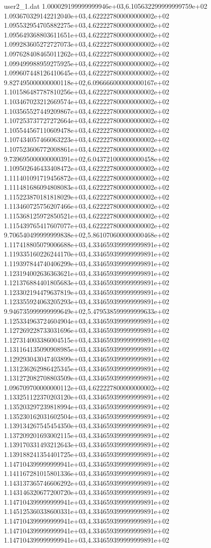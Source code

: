 \begin{filecontents}{user2_1.dat}
1.000029199999999946e+03,6.105632299999999759e+02
1.093670329142212040e+03,4.622227800000000002e+02
1.095532954705882275e+03,4.622227800000000002e+02
1.095649368803611651e+03,4.622227800000000002e+02
1.099283605272727073e+03,4.622227800000000002e+02
1.097628408465011262e+03,4.622227800000000002e+02
1.099499988959275925e+03,4.622227800000000002e+02
1.099607448126410645e+03,4.622227800000000002e+02
9.827495000000000118e+02,6.096666000000000167e+02
1.101586487787810256e+03,4.622227800000000002e+02
1.103467023212669574e+03,4.622227800000000002e+02
1.103565527449209867e+03,4.622227800000000002e+02
1.107253737727272664e+03,4.622227800000000002e+02
1.105544567110609478e+03,4.622227800000000002e+02
1.107434057466063223e+03,4.622227800000000002e+02
1.107523606772008861e+03,4.622227800000000002e+02
9.739695000000000391e+02,6.043721000000000458e+02
1.109502646433408472e+03,4.622227800000000002e+02
1.111401091719456872e+03,4.622227800000000002e+02
1.111481686094808083e+03,4.622227800000000002e+02
1.115223870181818029e+03,4.622227800000000002e+02
1.113460725756207466e+03,4.622227800000000002e+02
1.115368125972850521e+03,4.622227800000000002e+02
1.115439765417607077e+03,4.622227800000000002e+02
9.706540499999999838e+02,5.861070600000000468e+02
1.117418805079006688e+03,4.334659399999999891e+02
1.119335160226244170e+03,4.334659399999999891e+02
1.119397844740406299e+03,4.334659399999999891e+02
1.123194002636363621e+03,4.334659399999999891e+02
1.121376884401805683e+03,4.334659399999999891e+02
1.123302194479637819e+03,4.334659399999999891e+02
1.123355924063205293e+03,4.334659399999999891e+02
9.946735999999999649e+02,5.479538599999999633e+02
1.125334963724604904e+03,4.334659399999999891e+02
1.127269228733031696e+03,4.334659399999999891e+02
1.127314003386004515e+03,4.334659399999999891e+02
1.131164135090908985e+03,4.334659399999999891e+02
1.129293043047403899e+03,4.334659399999999891e+02
1.131236262986425345e+03,4.334659399999999891e+02
1.131272082708803509e+03,4.334659399999999891e+02
1.096709700000000112e+03,4.622227800000000002e+02
1.133251122370203120e+03,4.334659399999999891e+02
1.135203297239818994e+03,4.334659399999999891e+02
1.135230162031602504e+03,4.334659399999999891e+02
1.139134267545454350e+03,4.334659399999999891e+02
1.137209201693002115e+03,4.334659399999999891e+02
1.139170331493212643e+03,4.334659399999999891e+02
1.139188241354401725e+03,4.334659399999999891e+02
1.147104399999999941e+03,4.334659399999999891e+02
1.141167281015801336e+03,4.334659399999999891e+02
1.143137365746606292e+03,4.334659399999999891e+02
1.143146320677200720e+03,4.334659399999999891e+02
1.147104399999999941e+03,4.334659399999999891e+02
1.145125360338600331e+03,4.334659399999999891e+02
1.147104399999999941e+03,4.334659399999999891e+02
1.147104399999999941e+03,4.334659399999999891e+02
1.147104399999999941e+03,4.334659399999999891e+02
\end{filecontents}